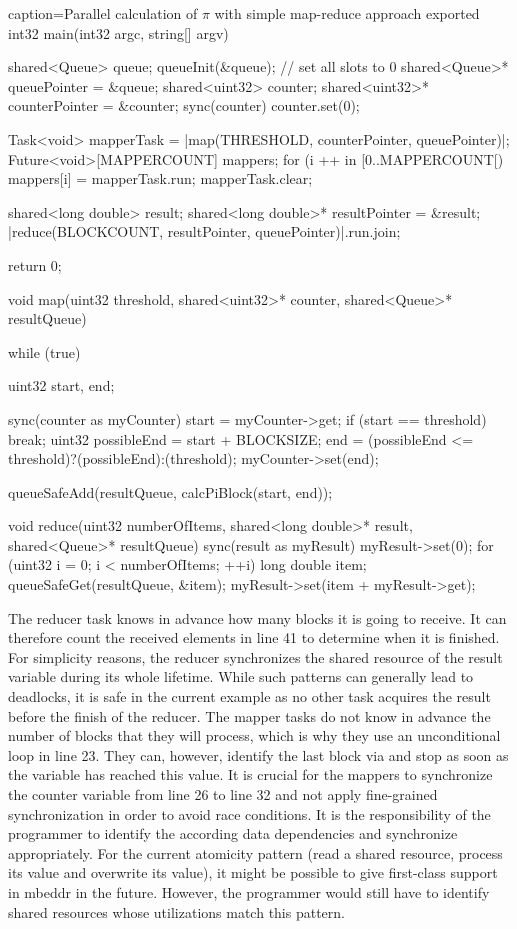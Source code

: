 \begin{ccode}{caption=Parallel calculation of $\pi$ with simple map-reduce approach}
exported int32 main(int32 argc, string[] argv) { 
  shared<Queue> queue; 
  queueInit(&queue);  // set all slots to 0
  shared<Queue>* queuePointer = &queue; 
  shared<uint32> counter; 
  shared<uint32>* counterPointer = &counter; 
  sync(counter) { counter.set(0); } 
   
  Task<void> mapperTask = |map(THRESHOLD, counterPointer, queuePointer)|; 
  Future<void>[MAPPERCOUNT] mappers; 
  for (i ++ in [0..MAPPERCOUNT[) { mappers[i] = mapperTask.run; }
  mapperTask.clear; 
   
  shared<long double> result; 
  shared<long double>* resultPointer = &result;  
  |reduce(BLOCKCOUNT, resultPointer, queuePointer)|.run.join; 
  
  return 0; 
}
 
void map(uint32 threshold, shared<uint32>* counter, shared<Queue>* resultQueue) { 
  while (true) { 
    uint32 start, end; 
     
    sync(counter as myCounter) { 
      start = myCounter->get; 
      if (start == threshold) { break; }
      uint32 possibleEnd = start + BLOCKSIZE; 
      end = (possibleEnd <= threshold)?(possibleEnd):(threshold); 
      myCounter->set(end); 
    } 
     
    queueSafeAdd(resultQueue, calcPiBlock(start, end)); 
  }
}
 
void reduce(uint32 numberOfItems, shared<long double>* result, shared<Queue>* resultQueue) { 
  sync(result as myResult) { 
    myResult->set(0); 
    for (uint32 i = 0; i < numberOfItems; ++i) { 
      long double item; 
      queueSafeGet(resultQueue, &item); 
      myResult->set(item + myResult->get); 
    }
  } 
}
\end{ccode}

The reducer task knows in advance how many blocks it is going to receive. It can therefore count the received elements in line 41 to determine when it is finished. For simplicity reasons, the reducer synchronizes the shared resource of the result variable during its whole lifetime. While such patterns can generally lead to deadlocks, it is safe in the current example as no other task acquires the result before the finish of the reducer. The mapper tasks do not know in advance the number of blocks that they will process, which is why they use an unconditional loop in line 23. They can, however, identify the last block via  and stop as soon as the  variable has reached this value. It is crucial for the mappers to synchronize the counter variable from line 26 to line 32 and not apply fine-grained synchronization in order to avoid race conditions. It is the responsibility of the programmer to identify the according data dependencies and synchronize appropriately. For the current atomicity pattern (read a shared resource, process its value and overwrite its value), it might be possible to give first-class support in mbeddr in the future. However, the programmer would still have to identify shared resources whose utilizations match this pattern.

